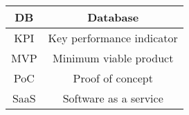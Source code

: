 \begin{tabular}{| c | c |}
    \hline
    DB & Database \\ 
    \hline
    KPI & Key performance indicator \\
    \hline
    MVP & Minimum viable product \\
    \hline
    PoC & Proof of concept \\
    \hline
    SaaS & Software as a service \\
    \hline
\end{tabular}
